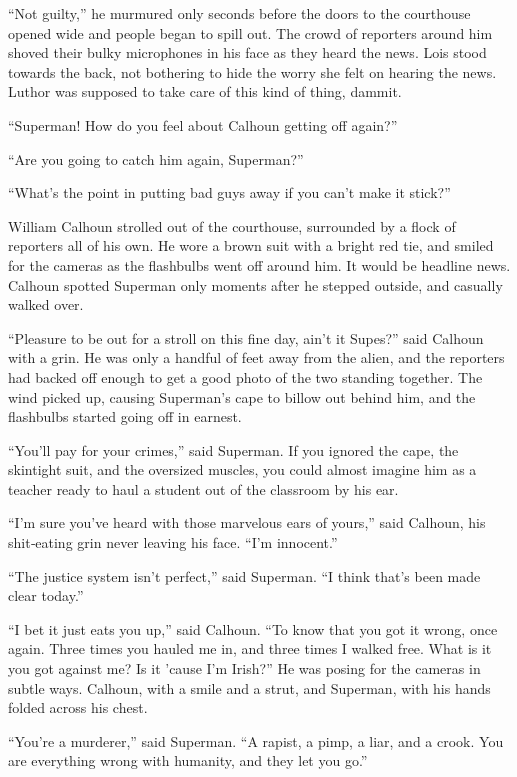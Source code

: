 ``Not guilty,'' he murmured only seconds before the doors to the
courthouse opened wide and people began to spill out. The crowd of
reporters around him shoved their bulky microphones in his face as they
heard the news. Lois stood towards the back, not bothering to hide the
worry she felt on hearing the news. Luthor was supposed to take care of
this kind of thing, dammit.

``Superman! How do you feel about Calhoun getting off again?''

``Are you going to catch him again, Superman?''

``What's the point in putting bad guys away if you can't make it
stick?''

William Calhoun strolled out of the courthouse, surrounded by a flock of
reporters all of his own. He wore a brown suit with a bright red tie,
and smiled for the cameras as the flashbulbs went off around him. It
would be headline news. Calhoun spotted Superman only moments after he
stepped outside, and casually walked over.

``Pleasure to be out for a stroll on this fine day, ain't it Supes?''
said Calhoun with a grin. He was only a handful of feet away from the
alien, and the reporters had backed off enough to get a good photo of
the two standing together. The wind picked up, causing Superman's cape
to billow out behind him, and the flashbulbs started going off in
earnest.

``You'll pay for your crimes,'' said Superman. If you ignored the cape,
the skintight suit, and the oversized muscles, you could almost imagine
him as a teacher ready to haul a student out of the classroom by his
ear.

``I'm sure you've heard with those marvelous ears of yours,'' said
Calhoun, his shit‐eating grin never leaving his face. ``I'm innocent.''

``The justice system isn't perfect,'' said Superman. ``I think that's
been made clear today.''

``I bet it just eats you up,'' said Calhoun. ``To know that you got it
wrong, once again. Three times you hauled me in, and three times I
walked free. What is it you got against me? Is it 'cause I'm Irish?'' He
was posing for the cameras in subtle ways. Calhoun, with a smile and a
strut, and Superman, with his hands folded across his chest.

``You're a murderer,'' said Superman. ``A rapist, a pimp, a liar, and a
crook. You are everything wrong with humanity, and they let you go.''

